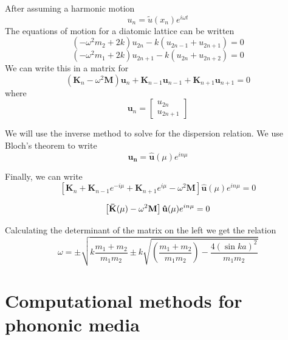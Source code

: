 \documentclass{article}
\begin{document}
After assuming a harmonic motion
\begin{equation}
u_n = \tilde{u}(x_n)e^{i\omega t}
\end{equation}
The equations of motion for a diatomic lattice can be written
\begin{equation}
(-\omega^2m_2 + 2k)u_{2n} - k(u_{2n-1} + u_{2n+1}) = 0
\end{equation}
\begin{equation}
(-\omega^2m_1 + 2k)u_{2n+1} - k(u_{2n} + u_{2n+2}) = 0
\end{equation}
We can write this in a matrix for
\begin{equation}
(\mathbf{K}_n - \omega^2 \mathbf{M})\mathbf{u}_n + 
\mathbf{K}_{n-1}\mathbf{u}_{n-1}
+ \mathbf{K}_{n+1}\mathbf{u}_{n+1} = 0
\end{equation}
where
\begin{equation}
\mathbf{u}_n =
\begin{bmatrix}
u_{2n} \\
u_{2n+1}
\end{bmatrix}
\end{equation}

We will use the inverse method to solve for the dispersion relation. We use 
Bloch's theorem to write
\begin{equation}
\mathbf{u_n}= \mathbf{\hat{u}}(\mu)e^{in\mu}
\end{equation}

Finally, we can write
\begin{equation}
\left[\mathbf{K}_n + \mathbf{K}_{n-1}e^{-i\mu} + \mathbf{K}_{n+1}e^{i\mu} 
-\omega^2 \mathbf{M} \right] \mathbf{\hat{u}}(\mu)e^{in\mu} = 0
\end{equation}

\begin{equation}
\left[\mathbf{\Bar{K}}(\mu) -\omega^2 \mathbf{M} \right] 
\mathbf{\hat{u}}(\mu)e^{in\mu} = 0
\end{equation}

Calculating the determinant of the matrix on the left we get the relation
\begin{equation}
\omega =\pm \sqrt{k\frac{m_1+m_2}{m_1m_2} \pm k 
\sqrt{\left(\frac{m_1+m_2}{m_1m_2}\right) - \frac{4(\sin{ka})^2}{m_1m_2}}}
\end{equation}

\section{Computational methods for phononic media} \label{methods}
\end{document}
